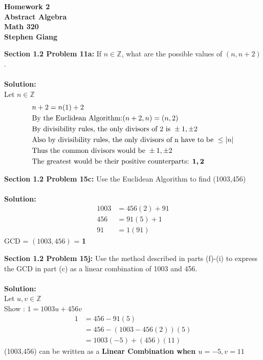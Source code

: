 \documentclass[12pt]{article}
\begin{document}
	
	\begin{center}
		\textbf{Homework 2} \\
		\textbf{Abstract Algebra} \\
		\textbf{Math 320} \\
		\textbf{Stephen Giang} \\
	\end{center}

\noindent \textbf{Section 1.2 Problem 11a:} 
If $n \in \mathbb{Z}$, what are the possible values of $(n, n + 2)$.
\\\\
\textbf{Solution:} \\
Let $n \in \mathbb{Z}$
	\begin{align}
		&n+2 = n(1)+2\\
		&\text{By the Euclidean Algorithm:} (n+2,n) = (n,2) \\
		&\text{By divisibility rules, the only divisors of } 2 \text{ is } \pm 1,\pm 2 \\
		&\text{Also by divisibility rules, the only divisors of n have to be } \leq |n| \\
		&\text{Thus the common divisors would be } \pm 1,\pm 2 \\
		&\text{The greatest would be their positive counterparts: } \boldmath{\text{$1,2$}} \\
	\end{align}

\vspace{\baselineskip}
\vspace{\baselineskip}
\noindent \textbf{Section 1.2 Problem 15c:} 
Use the Euclidean Algorithm to find (1003,456)
\\\\
\textbf{Solution:} 
	\begin{align}
		1003 &= 456(2) + 91 \\
		456  &= 91(5) + 1 \\
		91   &= 1(91) 
	\end{align}
GCD = $(1003,456)$ = \textbf{1}

\vspace{\baselineskip}
\vspace{\baselineskip}
\noindent \textbf{Section 1.2 Problem 15j:} 
Use the method described in parts (f)-(i) to express the GCD in part (c) as a linear combination of 1003 and 456.
\\\\
\textbf{Solution:} \\
Let $u,v \in \mathbb{Z}$ \\
Show : $1 = 1003u + 456v$
	\begin{align}
		1 
		&= 456 - 91(5) \\
		&= 456 - (1003 - 456(2))(5) \\
		&= 1003(-5) + (456)(11) 
	\end{align}
(1003,456) can be written as a \textbf{Linear Combination when \boldmath$u = -5, v = 11$} 
\end{document}
